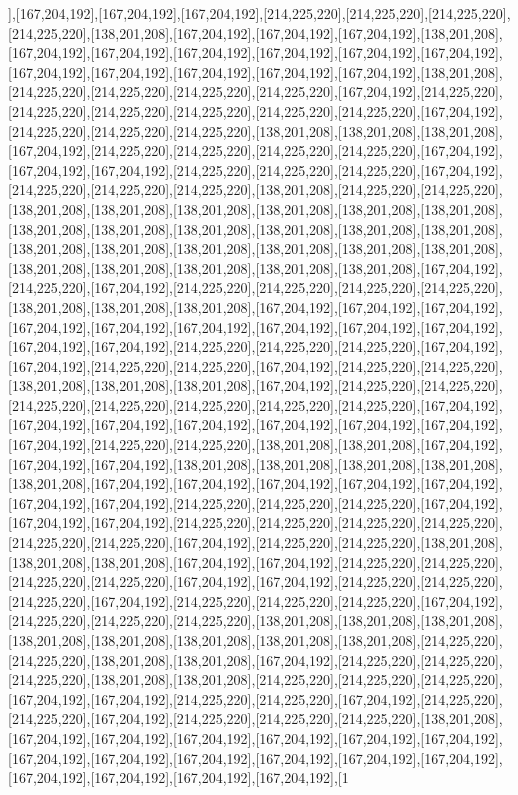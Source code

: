 ],[167,204,192],[167,204,192],[167,204,192],[214,225,220],[214,225,220],[214,225,220],[214,225,220],[138,201,208],[167,204,192],[167,204,192],[167,204,192],[138,201,208],[167,204,192],[167,204,192],[167,204,192],[167,204,192],[167,204,192],[167,204,192],[167,204,192],[167,204,192],[167,204,192],[167,204,192],[167,204,192],[138,201,208],[214,225,220],[214,225,220],[214,225,220],[214,225,220],[167,204,192],[214,225,220],[214,225,220],[214,225,220],[214,225,220],[214,225,220],[214,225,220],[167,204,192],[214,225,220],[214,225,220],[214,225,220],[138,201,208],[138,201,208],[138,201,208],[167,204,192],[214,225,220],[214,225,220],[214,225,220],[214,225,220],[167,204,192],[167,204,192],[167,204,192],[214,225,220],[214,225,220],[214,225,220],[167,204,192],[214,225,220],[214,225,220],[214,225,220],[138,201,208],[214,225,220],[214,225,220],[138,201,208],[138,201,208],[138,201,208],[138,201,208],[138,201,208],[138,201,208],[138,201,208],[138,201,208],[138,201,208],[138,201,208],[138,201,208],[138,201,208],[138,201,208],[138,201,208],[138,201,208],[138,201,208],[138,201,208],[138,201,208],[138,201,208],[138,201,208],[138,201,208],[138,201,208],[138,201,208],[167,204,192],[214,225,220],[167,204,192],[214,225,220],[214,225,220],[214,225,220],[214,225,220],[138,201,208],[138,201,208],[138,201,208],[167,204,192],[167,204,192],[167,204,192],[167,204,192],[167,204,192],[167,204,192],[167,204,192],[167,204,192],[167,204,192],[167,204,192],[167,204,192],[214,225,220],[214,225,220],[214,225,220],[167,204,192],[167,204,192],[214,225,220],[214,225,220],[167,204,192],[214,225,220],[214,225,220],[138,201,208],[138,201,208],[138,201,208],[167,204,192],[214,225,220],[214,225,220],[214,225,220],[214,225,220],[214,225,220],[214,225,220],[214,225,220],[167,204,192],[167,204,192],[167,204,192],[167,204,192],[167,204,192],[167,204,192],[167,204,192],[167,204,192],[214,225,220],[214,225,220],[138,201,208],[138,201,208],[167,204,192],[167,204,192],[167,204,192],[138,201,208],[138,201,208],[138,201,208],[138,201,208],[138,201,208],[167,204,192],[167,204,192],[167,204,192],[167,204,192],[167,204,192],[167,204,192],[167,204,192],[214,225,220],[214,225,220],[214,225,220],[167,204,192],[167,204,192],[167,204,192],[214,225,220],[214,225,220],[214,225,220],[214,225,220],[214,225,220],[214,225,220],[167,204,192],[214,225,220],[214,225,220],[138,201,208],[138,201,208],[138,201,208],[167,204,192],[167,204,192],[214,225,220],[214,225,220],[214,225,220],[214,225,220],[167,204,192],[167,204,192],[214,225,220],[214,225,220],[214,225,220],[167,204,192],[214,225,220],[214,225,220],[214,225,220],[167,204,192],[214,225,220],[214,225,220],[214,225,220],[138,201,208],[138,201,208],[138,201,208],[138,201,208],[138,201,208],[138,201,208],[138,201,208],[138,201,208],[214,225,220],[214,225,220],[138,201,208],[138,201,208],[167,204,192],[214,225,220],[214,225,220],[214,225,220],[138,201,208],[138,201,208],[214,225,220],[214,225,220],[214,225,220],[167,204,192],[167,204,192],[214,225,220],[214,225,220],[167,204,192],[214,225,220],[214,225,220],[167,204,192],[214,225,220],[214,225,220],[214,225,220],[138,201,208],[167,204,192],[167,204,192],[167,204,192],[167,204,192],[167,204,192],[167,204,192],[167,204,192],[167,204,192],[167,204,192],[167,204,192],[167,204,192],[167,204,192],[167,204,192],[167,204,192],[167,204,192],[167,204,192],[1